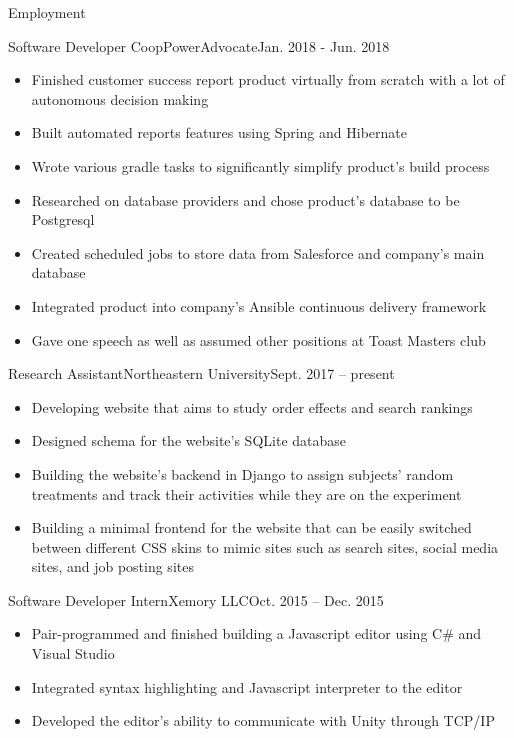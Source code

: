 \documentclass[]{mcdowellcv}
\begin{document}
	\makeheader

	\begin{cvsection}{Employment}
		\begin{cvsubsection}{Software Developer Coop}{PowerAdvocate}{Jan. 2018 - Jun. 2018}
			\begin{itemize}
				\item Finished customer success report product virtually from scratch with a lot of autonomous decision making
				\item Built automated reports features using Spring and Hibernate
				\item Wrote various gradle tasks to significantly simplify product's build process
                                \item Researched on database providers and chose product's database to be Postgresql
                                \item Created scheduled jobs to store data from Salesforce and company's main database
                                \item Integrated product into company's Ansible continuous delivery framework
                                \item Gave one speech as well as assumed other positions at Toast Masters club
			\end{itemize}
		\end{cvsubsection}

		\begin{cvsubsection}{Research Assistant}{Northeastern University}{Sept. 2017 -- present}
			\begin{itemize}
				\item Developing website that aims to study order effects and search rankings
				\item Designed schema for the website's SQLite database
                                \item Building the website's backend in Django to assign subjects' random treatments and track their activities while they are on the experiment
                                \item Building a minimal frontend for the website that can be easily switched between different CSS skins to mimic sites such as search sites, social media sites, and job posting sites
			\end{itemize}
		\end{cvsubsection}

		\begin{cvsubsection}{Software Developer Intern}{Xemory LLC}{Oct. 2015 -- Dec. 2015}
			\begin{itemize}
				\item Pair-programmed and finished building a Javascript editor using C\# and Visual Studio
				\item Integrated syntax highlighting and Javascript interpreter to the editor
                                \item Developed the editor's ability to communicate with Unity through TCP/IP
			\end{itemize}
		\end{cvsubsection}
	\end{cvsection}
\end{document}
